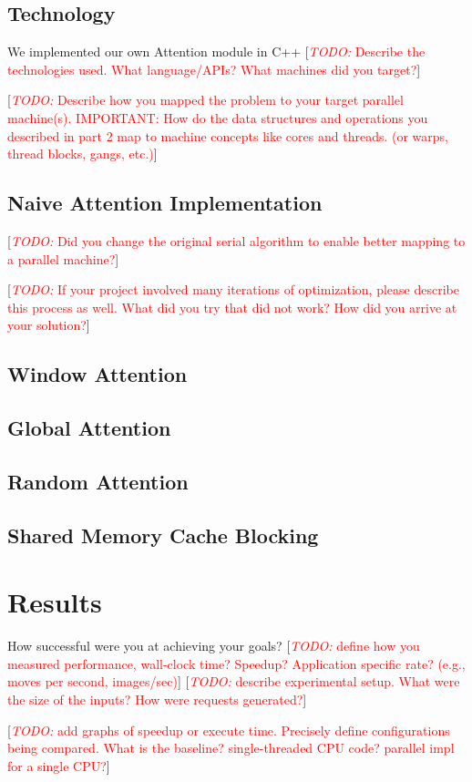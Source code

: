 \documentclass[11pt]{article}
\newcommand{\todo}[1]{[\textcolor{red}{\textit{TODO: }{#1}}]}
\begin{document}
\subsection{Technology}
We implemented our own Attention module in C++ 
\todo{Describe the technologies used. What language/APIs? What machines did you target?}

\todo{Describe how you mapped the problem to your target parallel machine(s). IMPORTANT: How do the data structures and operations you described in part 2 map to machine concepts like cores and threads. (or warps, thread blocks, gangs, etc.)}
\subsection{Naive Attention Implementation}
\todo{Did you change the original serial algorithm to enable better mapping to a parallel machine?}

\todo{If your project involved many iterations of optimization, please describe this process as well. What did you try that did not work? How did you arrive at your solution?}

\subsection{Window Attention}
\subsection{Global Attention}
\subsection{Random Attention}
\subsection{Shared Memory Cache Blocking}
\section{Results}
How successful were you at achieving your goals?
\todo{define how you measured performance, wall-clock time? Speedup? Application specific rate? (e.g., moves per second, images/sec)}
\todo{describe experimental setup. What were the size of the inputs? How were requests generated?}

\todo{add graphs of speedup or execute time. Precisely define configurations being compared. What is the baseline? single-threaded CPU code? parallel impl for a single CPU?}
\end{document}
